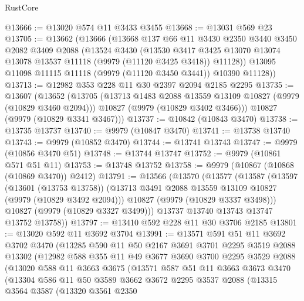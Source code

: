 \begin{lexlean}{RustCore}
\begin{coremodule}
@13666 := @13020 @574 @11 @3433 @3455
@13668 := @13031 @569 @23
@13705 := @13662
    (@13666
      (@13668
        @137
        @66
        @11
        @3430
        @2350
        @3440
        @3450
        @2082
        @3409
        @2088
        (@13524
          @3430
          (@13530
            @3417
            @3425
            @13070
            @13074
            @13078
            @13537
            @11118
            (@9979 (@11120 @3425 @3418))
            @11128))
        @13095
        @11098
        @11115
        @11118
        (@9979 (@11120 @3450 @3441))
        @10390
        @11128))
@13713 := @12982 @353 @228 @11 @30 @2397 @2094 @2185 @2295
@13735 := @13607
    (@13652
      (@13705
        (@13713 @1483 @2088 @13559 @13109 @10827 (@9979 (@10829 @3460 @2094)))
        @10827
        (@9979 (@10829 @3402 @3466)))
      @10827
      (@9979 (@10829 @3341 @3467)))
@13737 := @10842 (@10843 @3470)
@13738 := @13735 @13737
@13740 := @9979 (@10847 @3470)
@13741 := @13738 @13740
@13743 := @9979 (@10852 @3470)
@13744 := @13741 @13743
@13747 := @9979 (@10856 @3470 @51)
@13748 := @13744 @13747
@13752 := @9979 (@10861 @571 @51 @11)
@13753 := @13748 @13752
@13758 := @9979 (@10867 (@10868 (@10869 @3470)) @2412)
@13791 := @13566
    (@13570
      (@13577
        (@13587
          (@13597
            (@13601 (@13753 @13758))
            (@13713 @3491 @2088 @13559 @13109 @10827 (@9979 (@10829 @3492 @2094)))
            @10827
            (@9979 (@10829 @3337 @3498)))
          @10827
          (@9979 (@10829 @3327 @3499)))
        @13737
        @13740
        @13743
        @13747
        @13752
        @13758))
@13797 := @13410 @592 @228 @11 @30 @3706 @2185
@13801 := @13020 @592 @11 @3692 @3704
@13991 := @13571
    @591
    @51
    @11
    @3692
    @3702
    @3470
    (@13285
      @590
      @11
      @50
      @2167
      @3691
      @3701
      @2295
      @3519
      @2088
      @13302
      (@12982
        @588
        @355
        @11
        @49
        @3677
        @3690
        @3700
        @2295
        @3529
        @2088
        (@13020
          @588
          @11
          @3663
          @3675
          (@13571
            @587
            @51
            @11
            @3663
            @3673
            @3470
            (@13304
              @586
              @11
              @50
              @3589
              @3662
              @3672
              @2295
              @3537
              @2088
              (@13315
                @3564
                @3587
                (@13320
                  @3561
                  @2350

\end{coremodule}
\end{lexlean}
